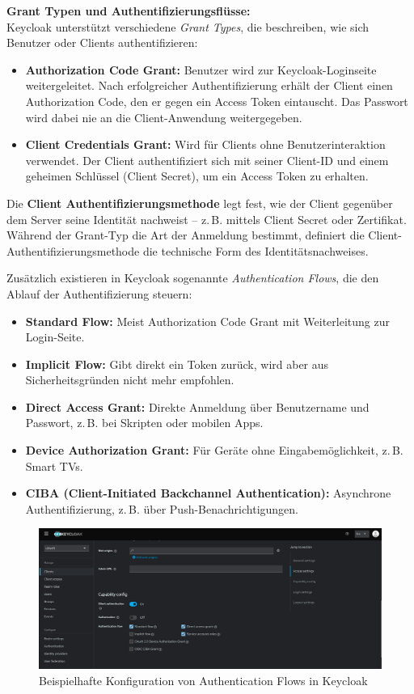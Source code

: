 \documentclass[a4paper,12pt]{article}
\begin{document}
	\vspace{0.5em}
	\textbf{Grant Typen und Authentifizierungsflüsse:}\\
	Keycloak unterstützt verschiedene \textit{Grant Types}, die beschreiben, wie sich Benutzer oder Clients authentifizieren:
	
	\begin{itemize}
		\item \textbf{Authorization Code Grant:} Benutzer wird zur Keycloak-Loginseite weitergeleitet. Nach erfolgreicher Authentifizierung erhält der Client einen Authorization Code, den er gegen ein Access Token eintauscht. Das Passwort wird dabei nie an die Client-Anwendung weitergegeben.
		\item \textbf{Client Credentials Grant:} Wird für Clients ohne Benutzerinteraktion verwendet. Der Client authentifiziert sich mit seiner Client-ID und einem geheimen Schlüssel (Client Secret), um ein Access Token zu erhalten.
	\end{itemize}
	
	Die \textbf{Client Authentifizierungsmethode} legt fest, wie der Client gegenüber dem Server seine Identität nachweist – z.\,B. mittels Client Secret oder Zertifikat. Während der Grant-Typ die Art der Anmeldung bestimmt, definiert die Client-Authentifizierungsmethode die technische Form des Identitätsnachweises.
	
	Zusätzlich existieren in Keycloak sogenannte \textit{Authentication Flows}, die den Ablauf der Authentifizierung steuern:
	
	\begin{itemize}
		\item \textbf{Standard Flow:} Meist Authorization Code Grant mit Weiterleitung zur Login-Seite.
		\item \textbf{Implicit Flow:} Gibt direkt ein Token zurück, wird aber aus Sicherheitsgründen nicht mehr empfohlen.
		\item \textbf{Direct Access Grant:} Direkte Anmeldung über Benutzername und Passwort, z.\,B. bei Skripten oder mobilen Apps.
		\item \textbf{Device Authorization Grant:} Für Geräte ohne Eingabemöglichkeit, z.\,B. Smart TVs.
		\item \textbf{CIBA (Client-Initiated Backchannel Authentication):} Asynchrone Authentifizierung, z.\,B. über Push-Benachrichtigungen.
	\end{itemize}
	
	\begin{figure}[H]
		\centering
		\includegraphics[width=0.9\linewidth]{screenshot013}
		\caption{Beispielhafte Konfiguration von Authentication Flows in Keycloak}
		\label{fig:screenshot013}
	\end{figure}
	
\end{document}
